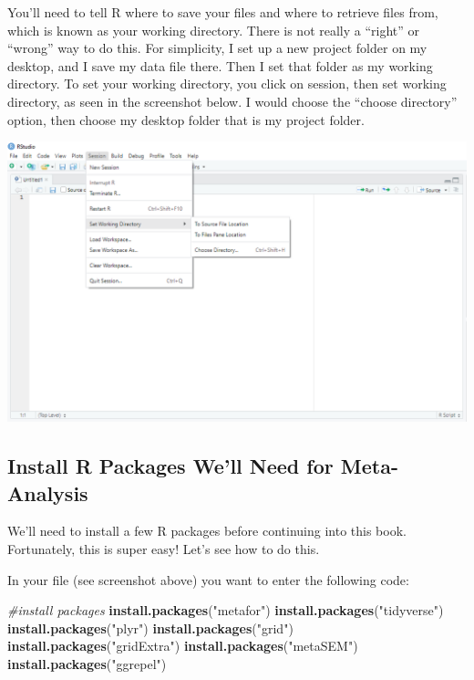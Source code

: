 \documentclass[
]{book}
\newenvironment{Shaded}{\begin{snugshade}}{\end{snugshade}}
\newcommand{\CommentTok}[1]{\textcolor[rgb]{0.56,0.35,0.01}{\textit{#1}}}
\newcommand{\FunctionTok}[1]{\textcolor[rgb]{0.13,0.29,0.53}{\textbf{#1}}}
\newcommand{\NormalTok}[1]{#1}
\newcommand{\StringTok}[1]{\textcolor[rgb]{0.31,0.60,0.02}{#1}}
\begin{document}
You'll need to tell R where to save your files and where to retrieve files from, which is known as your working directory. There is not really a ``right'' or ``wrong'' way to do this. For simplicity, I set up a new project folder on my desktop, and I save my data file there. Then I set that folder as my working directory. To set your working directory, you click on session, then set working directory, as seen in the screenshot below. I would choose the ``choose directory'' option, then choose my desktop folder that is my project folder.

\includegraphics[width=1\textwidth,height=\textheight]{images/workingdirectory.PNG}

\hypertarget{install-r-packages-well-need-for-meta-analysis}{%
\subsection{Install R Packages We'll Need for Meta-Analysis}\label{install-r-packages-well-need-for-meta-analysis}}

We'll need to install a few R packages before continuing into this book. Fortunately, this is super easy! Let's see how to do this.

In your file (see screenshot above) you want to enter the following code:

\begin{Shaded}
\begin{Highlighting}[]
\CommentTok{\#install packages}
\FunctionTok{install.packages}\NormalTok{(}\StringTok{"metafor"}\NormalTok{)}
\FunctionTok{install.packages}\NormalTok{(}\StringTok{"tidyverse"}\NormalTok{)}
\FunctionTok{install.packages}\NormalTok{(}\StringTok{"plyr"}\NormalTok{)}
\FunctionTok{install.packages}\NormalTok{(}\StringTok{"grid"}\NormalTok{)}
\FunctionTok{install.packages}\NormalTok{(}\StringTok{"gridExtra"}\NormalTok{)}
\FunctionTok{install.packages}\NormalTok{(}\StringTok{"metaSEM"}\NormalTok{)}
\FunctionTok{install.packages}\NormalTok{(}\StringTok{"ggrepel"}\NormalTok{)}
\end{Highlighting}
\end{Shaded}
\end{document}
